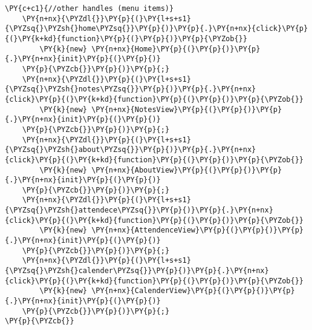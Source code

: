 \begin{Verbatim}[commandchars=\\\{\}]
    \PY{c+c1}{//other handles (menu items)}
    \PY{n+nx}{\PYZdl{}}\PY{p}{(}\PY{l+s+s1}{\PYZsq{}\PYZsh{}home\PYZsq{}}\PY{p}{)}\PY{p}{.}\PY{n+nx}{click}\PY{p}{(}\PY{k+kd}{function}\PY{p}{(}\PY{p}{)}\PY{p}{\PYZob{}}
        \PY{k}{new} \PY{n+nx}{Home}\PY{p}{(}\PY{p}{)}\PY{p}{.}\PY{n+nx}{init}\PY{p}{(}\PY{p}{)}
    \PY{p}{\PYZcb{}}\PY{p}{)}\PY{p}{;}
    \PY{n+nx}{\PYZdl{}}\PY{p}{(}\PY{l+s+s1}{\PYZsq{}\PYZsh{}notes\PYZsq{}}\PY{p}{)}\PY{p}{.}\PY{n+nx}{click}\PY{p}{(}\PY{k+kd}{function}\PY{p}{(}\PY{p}{)}\PY{p}{\PYZob{}}
        \PY{k}{new} \PY{n+nx}{NotesView}\PY{p}{(}\PY{p}{)}\PY{p}{.}\PY{n+nx}{init}\PY{p}{(}\PY{p}{)}
    \PY{p}{\PYZcb{}}\PY{p}{)}\PY{p}{;}
    \PY{n+nx}{\PYZdl{}}\PY{p}{(}\PY{l+s+s1}{\PYZsq{}\PYZsh{}about\PYZsq{}}\PY{p}{)}\PY{p}{.}\PY{n+nx}{click}\PY{p}{(}\PY{k+kd}{function}\PY{p}{(}\PY{p}{)}\PY{p}{\PYZob{}}
        \PY{k}{new} \PY{n+nx}{AboutView}\PY{p}{(}\PY{p}{)}\PY{p}{.}\PY{n+nx}{init}\PY{p}{(}\PY{p}{)}
    \PY{p}{\PYZcb{}}\PY{p}{)}\PY{p}{;}
    \PY{n+nx}{\PYZdl{}}\PY{p}{(}\PY{l+s+s1}{\PYZsq{}\PYZsh{}attendece\PYZsq{}}\PY{p}{)}\PY{p}{.}\PY{n+nx}{click}\PY{p}{(}\PY{k+kd}{function}\PY{p}{(}\PY{p}{)}\PY{p}{\PYZob{}}
        \PY{k}{new} \PY{n+nx}{AttendenceView}\PY{p}{(}\PY{p}{)}\PY{p}{.}\PY{n+nx}{init}\PY{p}{(}\PY{p}{)}
    \PY{p}{\PYZcb{}}\PY{p}{)}\PY{p}{;}
    \PY{n+nx}{\PYZdl{}}\PY{p}{(}\PY{l+s+s1}{\PYZsq{}\PYZsh{}calender\PYZsq{}}\PY{p}{)}\PY{p}{.}\PY{n+nx}{click}\PY{p}{(}\PY{k+kd}{function}\PY{p}{(}\PY{p}{)}\PY{p}{\PYZob{}}
        \PY{k}{new} \PY{n+nx}{CalenderView}\PY{p}{(}\PY{p}{)}\PY{p}{.}\PY{n+nx}{init}\PY{p}{(}\PY{p}{)}
    \PY{p}{\PYZcb{}}\PY{p}{)}\PY{p}{;}
\PY{p}{\PYZcb{}}
\end{Verbatim}
